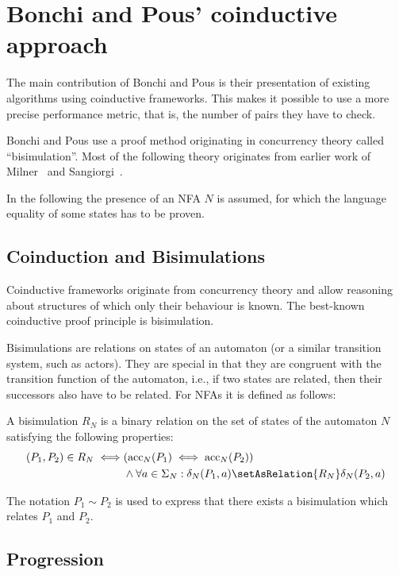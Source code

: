 \section{Bonchi and Pous' coinductive approach}

The main contribution of Bonchi and Pous is their presentation of existing
  algorithms using coinductive frameworks.
This makes it possible to use a more precise performance metric, that is,
  the number of pairs they have to check.

Bonchi and Pous use a proof method originating in concurrency theory called
  ``bisimulation''. Most of the following theory originates from earlier work of
  Milner~\cite{milner1989communication} and
  Sangiorgi~\cite{sangiorgi1998bisimulation}.

In the following the presence of an NFA $N$ is assumed, for which the language
  equality of some states has to be proven.

\subsection{Coinduction and Bisimulations}

Coinductive frameworks originate from concurrency theory and allow reasoning
  about structures of which only their behaviour is known.
  The best-known coinductive proof principle is bisimulation.

Bisimulations are relations on states of an automaton (or a similar transition
  system, such as actors).
They are special in that they are congruent with the transition function of the
  automaton, i.e., if two states are related,
  then their successors also have to be related.
For NFAs it is defined as follows:

\begin{definition}
  A bisimulation $R_N$ is a binary relation on the set of states of
    the automaton $N$ satisfying the following properties:
  \begin{align*}
    (P_1, P_2) \in R_N \iff &(\text{acc}_N(P_1) \iff \text{acc}_N(P_2))\\
      &\land \forall a \in \Sigma_N: \delta_N(P_1, a) \setAsRelation{R_N} \delta_N(P_2, a)
  \end{align*}

  The notation $P_1 \sim P_2$ is used to express that there exists a bisimulation
    which relates {$P_1$ and $P_2$}.
\end{definition}

\subsection{Progression}

